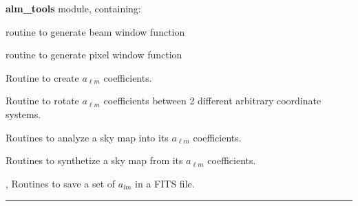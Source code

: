 \begin{modules}
  \begin{sulist}{} %
  \item[\textbf{alm\_tools}] module, containing:
	\item[\htmlref{generate\_beam}{sub:generate_beam}] routine to generate beam window function
	\item[\htmlref{pixel\_window}{sub:pixel_window}] routine to generate pixel window function
  \end{sulist}
\end{modules}

\begin{related}
  \begin{sulist}{} %
  \item[\htmlref{create\_alm}{sub:create_alm}] Routine to create $a_{\ell m}$ coefficients.
  \item[\htmlref{rotate\_alm}{sub:rotate_alm}] Routine to rotate $a_{\ell m}$
  coefficients between 2 different arbitrary coordinate systems.
  \item[\htmlref{map2alm}{sub:map2alm}]  Routines to analyze a \healpix sky map into its $a_{\ell m}$
  coefficients.
  \item[\htmlref{alm2map}{sub:alm2map}] Routines to synthetize a \healpix sky map from its $a_{\ell m}$
  coefficients.
  \item[\htmlref{alms2fits}{sub:alms2fits}, \htmlref{dump\_alms}{sub:dump_alms}]
  Routines to save a set of $a_{lm}$ in a FITS file.  
  \end{sulist}
\end{related}

\rule{\hsize}{2mm}

\newpage

